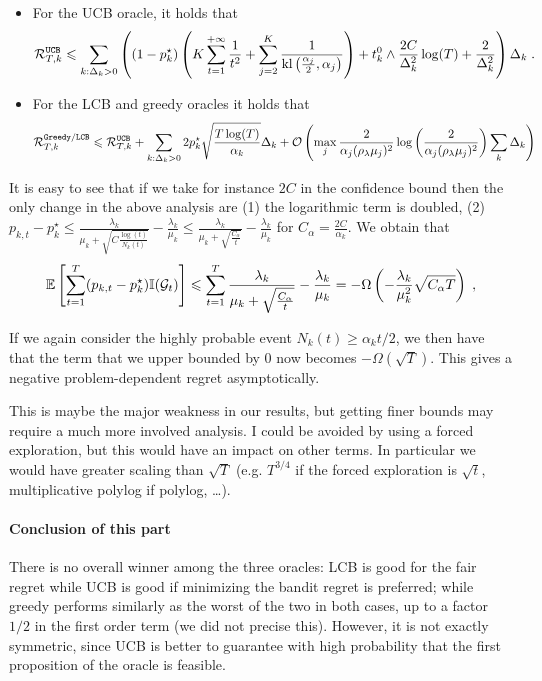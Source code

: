 \begin{itemize}
	\item For the UCB oracle, it holds that 
	\[\mathcal{R}_{T,k}^\text{\texttt{UCB}} \leqslant \sum_{k: \Delta_k>0}\left((1-p_k^\star)\left(K \sum_{t=1}^{+\infty} \frac{1}{t^2} + \sum_{j=2}^K\frac{1}{\text{\normalfont kl}\left(\frac{\alpha_j}{2}, \alpha_j\right)}\right) + t_k^0 \wedge  \frac{2C}{\Delta_k^2}\log(T) + \frac{2}{\Delta_k^2} \right)\Delta_k \;. \]
	\item For the LCB and greedy oracles it holds that 
	\[ \mathcal{R}_{T,k}^{\texttt{Greedy}/\texttt{LCB}} \leqslant \mathcal{R}_{T,k}^{\texttt{UCB}} + \sum_{k:\Delta_k>0} 2p_k^\star\sqrt{\frac{T\log(T)}{\alpha_k}} \Delta_k +  \mathcal{O}\left(\max_j\frac{2}{\alpha_j(\rho_\lambda \mu_j)^2}\log\left(\frac{2}{\alpha_j(\rho_\lambda \mu_j)^2}\right) \sum_{k} \Delta_k\right)
	\]
\end{itemize}



\begin{remark} 
	
	It is easy to see that if we take for instance $2C$ in the confidence bound then the only change in the above analysis are (1) the logarithmic term is doubled, (2) $p_{k, t}-p_k^\star\leq \frac{\lambda_k}{\mu_k+\sqrt{C\frac{\log(t)}{N_k(t)}}}-\frac{\lambda_k}{\mu_k}\leq \frac{\lambda_k}{\mu_k+\sqrt{\frac{C_\alpha}{t}}}-\frac{\lambda_k}{\mu_k}$ for $C_\alpha=\frac{2C}{\alpha_k}$. We obtain that
	\[\mathbb{E}\left[\sum_{t=1}^T(p_{k,t}-p_k^\star)\mathbb{I}(\mathcal{G}_t)\right] \leqslant \sum_{t=1}^T \frac{\lambda_k}{\mu_k+\sqrt{\frac{C_\alpha}{t}}}-\frac{\lambda_k}{\mu_k} = -\Omega\left(-\frac{\lambda_k}{\mu_k^2}\sqrt{C_\alpha T}\right)\;,
	\]
	
	If we again consider the highly probable event $N_k(t)\geq \alpha_k t/2$, we then have that the term that we upper bounded by $0$ now becomes $-\Omega(\sqrt{T})$. This gives a negative problem-dependent regret asymptotically.
\end{remark}


\begin{remark} 
	This is maybe the major weakness in our results, but getting finer bounds may require a much more involved analysis. I could be avoided by using a forced exploration, but this would have an impact on other terms. In particular we would have greater scaling than $\sqrt{T}$ (e.g. $T^{3/4}$ if the forced exploration is $\sqrt{t}$, multiplicative polylog if polylog, \dots). 
\end{remark}

\paragraph{Conclusion of this part} There is no overall winner among the three oracles: LCB is good for the fair regret while UCB is good if minimizing the bandit regret is preferred; while greedy performs similarly as the worst of the two in both cases, up to a factor $1/2$ in the first order term (we did not precise this). However, it is not exactly symmetric, since UCB is better to guarantee with high probability that the first proposition of the oracle is feasible.

